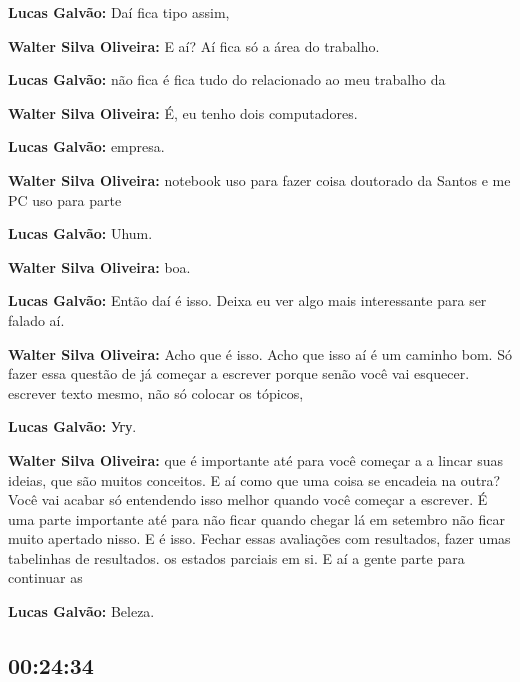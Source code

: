 \textbf{Lucas Galvão:} Daí fica tipo assim,



\textbf{Walter Silva Oliveira:} E aí? Aí fica só a área do trabalho.



\textbf{Lucas Galvão:} não fica é fica tudo do relacionado ao meu trabalho da



\textbf{Walter Silva Oliveira:} É, eu tenho dois computadores.



\textbf{Lucas Galvão:} empresa.



\textbf{Walter Silva Oliveira:} notebook uso para fazer coisa doutorado da Santos e me PC uso para parte



\textbf{Lucas Galvão:} Uhum.



\textbf{Walter Silva Oliveira:} boa.



\textbf{Lucas Galvão:} Então daí é isso. Deixa eu ver algo mais interessante para ser falado aí.



\textbf{Walter Silva Oliveira:} Acho que é isso. Acho que isso aí é um caminho bom. Só fazer essa questão de já começar a escrever porque senão você vai esquecer. escrever texto mesmo, não só colocar os tópicos,



\textbf{Lucas Galvão:} Угу.



\textbf{Walter Silva Oliveira:} que é importante até para você começar a a lincar suas ideias, que são muitos conceitos. E aí como que uma coisa se encadeia na outra? Você vai acabar só entendendo isso melhor quando você começar a escrever. É uma parte importante até para não ficar quando chegar lá em setembro não ficar muito apertado nisso. E é isso. Fechar essas avaliações com resultados, fazer umas tabelinhas de resultados. os estados parciais em si. E aí a gente parte para continuar as



\textbf{Lucas Galvão:} Beleza.



\subsection{\textbf{00:24:34}}



